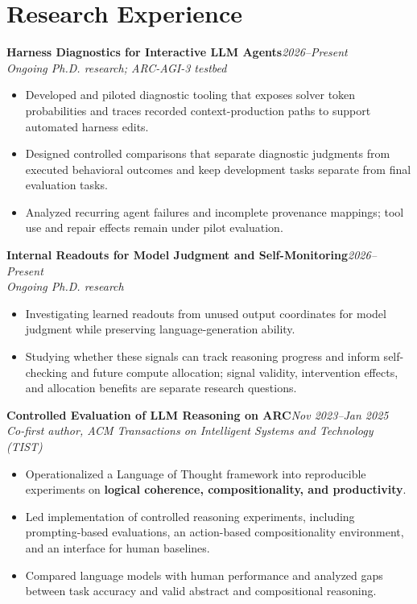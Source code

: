 \documentclass[10pt,a4paper]{article}
\newcommand{\entry}[3]{\textbf{#1}\hfill\textit{#2}\\\textit{#3}\par}
\begin{document}
\section{Research Experience}
\entry{Harness Diagnostics for Interactive LLM Agents}{2026--Present}{Ongoing Ph.D. research; ARC-AGI-3 testbed}
\begin{itemize}
  \item Developed and piloted diagnostic tooling that exposes solver token probabilities
  and traces recorded context-production paths to support automated harness edits.
  \item Designed controlled comparisons that separate diagnostic judgments from executed
  behavioral outcomes and keep development tasks separate from final evaluation tasks.
  \item Analyzed recurring agent failures and incomplete provenance mappings;
  tool use and repair effects remain under pilot evaluation.
\end{itemize}

\entry{Internal Readouts for Model Judgment and Self-Monitoring}{2026--Present}{Ongoing Ph.D. research}
\begin{itemize}
  \item Investigating learned readouts from unused output coordinates for model judgment
  while preserving language-generation ability.
  \item Studying whether these signals can track reasoning progress and inform self-checking
  and future compute allocation; signal validity, intervention effects, and allocation
  benefits are separate research questions.
\end{itemize}

\entry{Controlled Evaluation of LLM Reasoning on ARC}{Nov 2023--Jan 2025}{Co-first author, ACM Transactions on Intelligent Systems and Technology (TIST)}
\begin{itemize}
  \item Operationalized a Language of Thought framework into reproducible experiments
  on \textbf{logical coherence, compositionality, and productivity}.
  \item Led implementation of controlled reasoning experiments, including prompting-based
  evaluations, an action-based compositionality environment, and an interface for human baselines.
  \item Compared language models with human performance and analyzed gaps between
  task accuracy and valid abstract and compositional reasoning.
\end{itemize}
\end{document}
